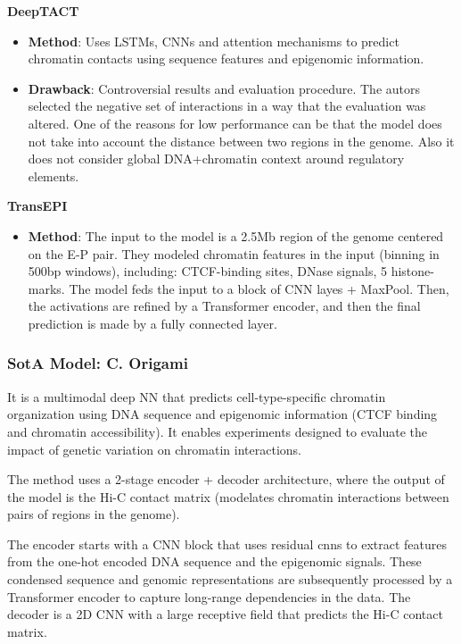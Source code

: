 \documentclass[a4paper]{article}
\begin{document}
\textbf{DeepTACT}

\begin{itemize}
  \item \textbf{Method}: Uses LSTMs, CNNs and attention mechanisms to predict 
  chromatin contacts using sequence features and epigenomic information.

  \item \textbf{Drawback}: Controversial results and evaluation procedure.
  The autors selected the negative set of interactions in a way that the
  evaluation was altered. One of the reasons for low performance can be that
  the model does not take into account the distance between two regions in 
  the genome. Also it does not consider global DNA+chromatin context 
  around regulatory elements.

\end{itemize}

\textbf{TransEPI}

\begin{itemize}
  \item \textbf{Method}: The input to the model is a 2.5Mb region
  of the genome centered on the E-P pair. They modeled chromatin features in the 
  input (binning in 500bp windows), including: CTCF-binding sites, DNase signals, 
  5 histone-marks. The model feds the input to a block of CNN layes + MaxPool. Then,
  the activations are refined by a Transformer encoder, and then the
  final prediction is made by a fully connected layer.

\end{itemize} 

\subsubsection*{SotA Model: C. Origami}

It is a multimodal deep NN that predicts cell-type-specific chromatin organization
using DNA sequence and epigenomic information (CTCF binding and chromatin accessibility).
It enables experiments designed to evaluate the impact of genetic variation
on chromatin interactions. 

The method uses a 2-stage encoder + decoder architecture, where the output
of the model is the Hi-C contact matrix (modelates chromatin interactions between
pairs of regions in the genome). 

The encoder starts with a CNN block that uses residual cnns to extract features
from the one-hot encoded DNA sequence and the epigenomic signals. 
These condensed sequence and genomic representations are subsequently
processed by a Transformer encoder to capture long-range dependencies in the
data. The decoder is a 2D CNN with a large receptive field that predicts the
Hi-C contact matrix.
\end{document}
